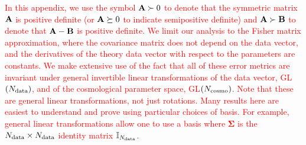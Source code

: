\documentclass[usenatbib]{mnras}
\newcommand{\changetext}[1]{\textcolor{red}{#1}}
\begin{document}
\changetext{In this appendix, we use the symbol ${\bf A}\succ 0$ to denote that the symmetric matrix ${\bf A}$ is positive definite (or ${\bf A}\succeq 0$ to indicate semipositive definite) and ${\bf A}\succ{\bf B}$ to denote that ${\bf A}-{\bf B}$ is positive definite. We limit our analysis to the Fisher matrix approximation, where the covariance matrix does not depend on the data vector, and the derivatives of the theory data vector with respect to the parameters are constants. We make extensive use of the fact that all of these error metrics are invariant under general invertible linear transformations of the data vector, GL$(N_{\rm data})$, and of the cosmological parameter space, GL$(N_{\rm cosmo})$. Note that these are general linear transformations, not just rotations. Many results here are easiest to understand and prove using particular choices of basis. For example, general linear transformations allow one to use a basis where ${\boldsymbol\Sigma}$ is the $N_{\rm data}\times N_{\rm data}$ identity matrix ${\mathbb I}_{N_{\rm data}}$.}
\end{document}

